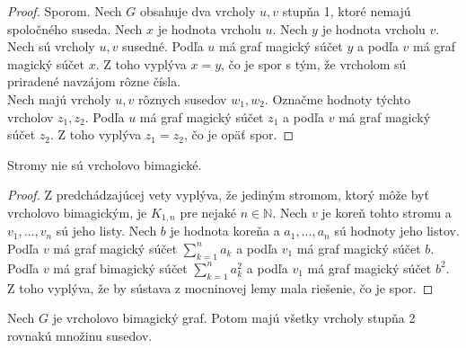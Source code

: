 \begin{proof} Sporom. Nech $G$ obsahuje dva vrcholy $u,v$ stupňa 1, ktoré nemajú spoločného suseda. Nech $x$ je hodnota vrcholu $u$. Nech $y$ je hodnota vrcholu $v$. \\

Nech sú vrcholy $u,v$ susedné. Podľa $u$ má graf magický súčet $y$ a podľa $v$ má graf magický súčet $x$. Z toho vyplýva $x = y$, čo je spor s tým, že vrcholom sú priradené navzájom rôzne čísla. \\

Nech majú vrcholy $u,v$ rôznych susedov $w_1, w_2$. Označme hodnoty týchto vrcholov $z_1, z_2$. Podľa $u$ má graf magický súčet $z_1$ a podľa $v$ má graf magický súčet $z_2$. Z toho vyplýva $z_1 = z_2$, čo je opäť spor.
\end{proof} 

\begin{subconsequence}  Stromy nie sú vrcholovo bimagické.
\end{subconsequence}

\begin{proof} Z predchádzajúcej vety vyplýva, že jediným stromom, ktorý môže byť vrcholovo bimagickým, je $K_{1,n}$ pre nejaké $n \in \mathbb{N}$. Nech $v$ je koreň tohto stromu a $v_1, ... , v_n$ sú jeho listy. Nech $b$ je hodnota koreňa a $a_1, ... , a_n$ sú hodnoty jeho listov. Podľa $v$ má graf magický súčet $\sum_{k=1}^{n} a_k$ a podľa $v_1$ má graf magický súčet $b$. Podľa $v$ má graf bimagický súčet $\sum_{k=1}^{n} a_k^2$ a podľa $v_1$ má graf magický súčet $b^2$. Z toho vyplýva, že by sústava z mocninovej lemy mala riešenie, čo je spor.
\end{proof} 

\begin{subtheorem} Nech $G$ je vrcholovo bimagický graf. Potom majú všetky vrcholy stupňa 2 rovnakú množinu susedov.
\end{subtheorem}

